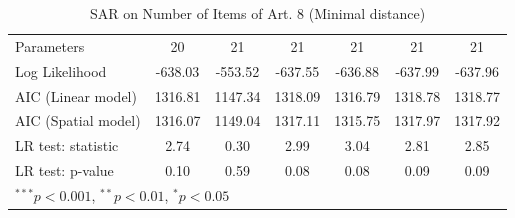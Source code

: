 \begin{table}[!h]
\begin{center}
\begin{tabular}{l c c c c c c }
Parameters              & 20           & 21           & 21           & 21           & 21           & 21           \\
Log Likelihood          & -638.03      & -553.52      & -637.55      & -636.88      & -637.99      & -637.96      \\
AIC (Linear model)      & 1316.81      & 1147.34      & 1318.09      & 1316.79      & 1318.78      & 1318.77      \\
AIC (Spatial model)     & 1316.07      & 1149.04      & 1317.11      & 1315.75      & 1317.97      & 1317.92      \\
LR test: statistic      & 2.74         & 0.30         & 2.99         & 3.04         & 2.81         & 2.85         \\
LR test: p-value        & 0.10         & 0.59         & 0.08         & 0.08         & 0.09         & 0.09         \\
\bottomrule
\multicolumn{7}{l}{\scriptsize{$^{***}p<0.001$, $^{**}p<0.01$, $^*p<0.05$}}
\end{tabular}
\caption{SAR on Number of Items of Art. 8 (Minimal distance)}
\label{table:coefficients}
\end{center}
\end{table}
